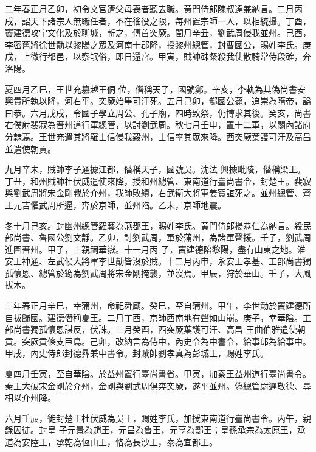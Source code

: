 \begin{pinyinscope}
 二年春正月乙卯，初令文官遭父母喪者聽去職。黃門侍郎陳叔達兼納言。二月丙戌，詔天下諸宗人無職任者，不在徭役之限，每州置宗師一人，以相統攝。丁酉，竇建德攻宇文化及於聊城，斬之，傳首突厥。閏月辛丑，劉武周侵我並州。己酉，李密舊將徐世勣以黎陽之眾及河南十郡降，授黎州總管，封曹國公，賜姓李氏。庚戌，上微行都邑，以察氓俗，即日還宮。甲寅，賊帥硃粲殺我使散騎常侍段確，奔洛陽。



 夏四月乙巳，王世充篡越王侗
 位，僭稱天子，國號鄭。辛亥，李軌為其偽尚書安興貴所執以降，河右平。突厥始畢可汗死。五月己卯，酅國公薨，追崇為隋帝，謚曰恭。六月戊戌，令國子學立周公、孔子廟，四時致祭，仍博求其後。癸亥，尚書右僕射裴寂為晉州道行軍總管，以討劉武周。秋七月壬申，置十二軍，以關內諸府分隸焉。王世充遣其將羅士信侵我穀州，士信率其眾來降。西突厥葉護可汗及高昌並遣使朝貢。



 九月辛未，賊帥李子通據江都，僭稱天子，國號吳。沈法
 興據毗陵，僭稱梁王。丁丑，和州賊帥杜伏威遣使來降，授和州總管、東南道行臺尚書令，封楚王。裴寂與劉武周將宋金剛戰於介州，我師敗績，右武衛大將軍姜寶誼死之。並州總管、齊王元吉懼武周所逼，奔於京師，並州陷。乙未，京師地震。



 冬十月己亥。封幽州總管羅藝為燕郡王，賜姓李氏。黃門侍郎楊恭仁為納言。殺民部尚書、魯國公劉文靜。乙卯，討劉武周，軍於蒲州，為諸軍聲援。壬子，劉武周進圍晉州。甲子，上親祠華嶽。十一月丙
 子，竇建德陷黎陽，盡有山東之地。淮安王神通、左武候大將軍李世勣皆沒於賊。十二月丙申，永安王孝基、工部尚書獨孤懷恩、總管於筠為劉武周將宋金剛掩襲，並沒焉。甲辰，狩於華山。壬子，大風拔木。



 三年春正月辛巳，幸蒲州，命祀舜廟。癸巳，至自蒲州。甲午，李世勣於竇建德所自拔歸國。建德僭稱夏王。二月丁酉，京師西南地有聲如山崩。庚子，幸華陰。工部尚書獨孤懷恩謀反，伏誅。三月癸酉，西突厥葉護可汗、高昌
 王曲伯雅遣使朝貢。突厥貢條支巨鳥。己卯，改納言為侍中，內史令為中書令，給事郎為給事中。甲戌，內史侍郎封德彞兼中書令。封賊帥劉孝真為彭城王，賜姓李氏。



 夏四月壬寅，至自華陰。於益州置行臺尚書省。甲寅，加秦王益州道行臺尚書令。秦王大破宋金剛於介州，金剛與劉武周俱奔突厥，遂平並州。偽總管尉遲敬德、尋相以介州降。



 六月壬辰，徙封楚王杜伏威為吳王，賜姓李氏，加授東南道行臺尚書令。丙午，親錄囚徒。封皇
 子元景為趙王，元昌為魯王，元亨為酆王；皇孫承宗為太原王，承道為安陸王，承乾為恆山王，恪為長沙王，泰為宜都王。




\end{pinyinscope}
